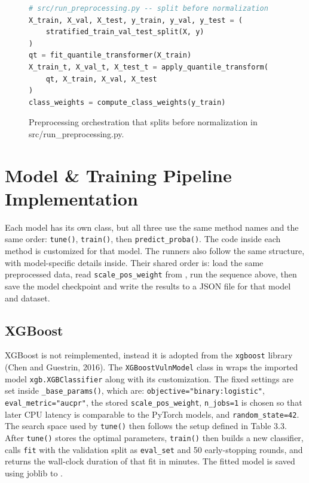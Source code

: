 \begin{figure}[H]
  \centering
\begin{lstlisting}[language=python]
# src/run_preprocessing.py -- split before normalization
X_train, X_val, X_test, y_train, y_val, y_test = (
    stratified_train_val_test_split(X, y)
)
qt = fit_quantile_transformer(X_train)
X_train_t, X_val_t, X_test_t = apply_quantile_transform(
    qt, X_train, X_val, X_test
)
class_weights = compute_class_weights(y_train)
\end{lstlisting}
  \caption{Preprocessing orchestration that splits before normalization in src/run\_preprocessing.py.}
  \label{fig:run-preprocessing}
\end{figure}

\section{Model \& Training Pipeline Implementation}

Each model has its own class, but all three use the same method names and the same order: \texttt{tune()}, \texttt{train()}, then \texttt{predict\_proba()}. The code inside each method is customized for that model. The runners also follow the same structure, with model-specific details inside. Their shared order is: load the same preprocessed data, read \texttt{scale\_pos\_weight} from , run the sequence above, then save the model checkpoint and write the results to a JSON file for that model and dataset.

\subsection{XGBoost}

XGBoost is not reimplemented, instead it is adopted from the \texttt{xgboost} library (Chen and Guestrin, 2016). The \texttt{XGBoostVulnModel} class in  wraps the imported model \texttt{xgb.XGBClassifier} along with its customization. The fixed settings are set inside \texttt{\_base\_params()}, which are: \texttt{objective="binary:logistic"}, \texttt{eval\_metric="aucpr"}, the stored \texttt{scale\_pos\_weight}, \texttt{n\_jobs=1} is chosen so that later CPU latency is comparable to the PyTorch models, and \texttt{random\_state=42}. The search space used by \texttt{tune()} then follows the setup defined in Table 3.3. After \texttt{tune()} stores the optimal parameters, \texttt{train()} then builds a new classifier, calls \texttt{fit} with the validation split as \texttt{eval\_set} and 50 early-stopping rounds, and returns the wall-clock duration of that fit in minutes. The fitted model is saved using joblib to .

